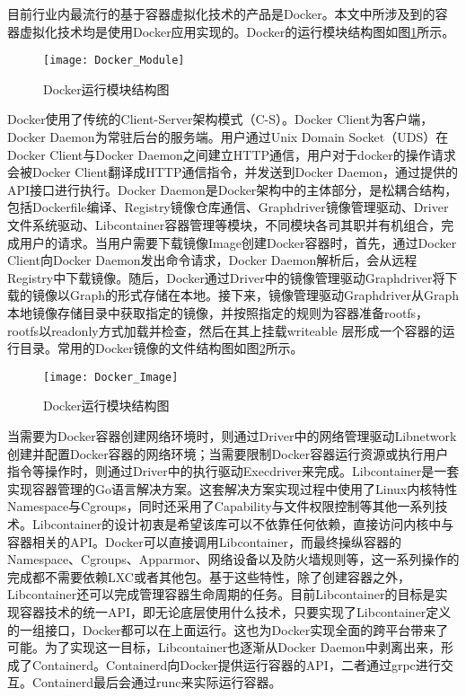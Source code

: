 目前行业内最流行的基于容器虚拟化技术的产品是Docker\citep{bernstein2014containers,马晓光2017一种适用于}。本文中所涉及到的容器虚拟化技术均是使用Docker应用实现的。Docker的运行模块结构图如图\ref{fig:docker_module}所示。

\begin{figure}[!htbp]
    \centering
    \texttt{[image: Docker\_Module]}
    \caption{Docker运行模块结构图}
    \label{fig:docker_module}
\end{figure}

Docker使用了传统的Client-Server架构模式（C-S）。Docker Client为客户端，Docker Daemon为常驻后台的服务端。用户通过Unix Domain Socket（UDS）在Docker Client与Docker Daemon之间建立HTTP通信，用户对于docker的操作请求会被Docker Client翻译成HTTP通信指令，并发送到Docker Daemon，通过提供的API接口进行执行。Docker Daemon是Docker架构中的主体部分，是松耦合结构，包括Dockerfile编译、Registry镜像仓库通信、Graphdriver镜像管理驱动、Driver文件系统驱动、Libcontainer容器管理等模块，不同模块各司其职并有机组合，完成用户的请求。当用户需要下载镜像Image创建Docker容器时，首先，通过Docker Client向Docker Daemon发出命令请求，Docker Daemon解析后，会从远程Registry中下载镜像。随后，Docker通过Driver中的镜像管理驱动Graphdriver将下载的镜像以Graph的形式存储在本地。接下来，镜像管理驱动Graphdriver从Graph本地镜像存储目录中获取指定的镜像，并按照指定的规则为容器准备rootfs，rootfs以readonly方式加载并检查，然后在其上挂载writeable 层形成一个容器的运行目录。常用的Docker镜像的文件结构图如图\ref{fig:docker_image}所示。

\begin{figure}[!htbp]
    \centering
    \texttt{[image: Docker\_Image]}
    \caption{Docker运行模块结构图}
    \label{fig:docker_image}
\end{figure}

当需要为Docker容器创建网络环境时，则通过Driver中的网络管理驱动Libnetwork创建并配置Docker容器的网络环境；当需要限制Docker容器运行资源或执行用户指令等操作时，则通过Driver中的执行驱动Execdriver来完成。Libcontainer是一套实现容器管理的Go语言解决方案。这套解决方案实现过程中使用了Linux内核特性Namespace与Cgroups，同时还采用了Capability与文件权限控制等其他一系列技术。Libcontainer的设计初衷是希望该库可以不依靠任何依赖，直接访问内核中与容器相关的API。Docker可以直接调用Libcontainer，而最终操纵容器的Namespace、Cgroups、Apparmor、网络设备以及防火墙规则等，这一系列操作的完成都不需要依赖LXC或者其他包。基于这些特性，除了创建容器之外，Libcontainer还可以完成管理容器生命周期的任务。目前Libcontainer的目标是实现容器技术的统一API，即无论底层使用什么技术，只要实现了Libcontainer定义的一组接口，Docker都可以在上面运行。这也为Docker实现全面的跨平台带来了可能。为了实现这一目标，Libcontainer也逐渐从Docker Daemon中剥离出来，形成了Containerd。Containerd向Docker提供运行容器的API，二者通过grpc进行交互。Containerd最后会通过runc来实际运行容器。

